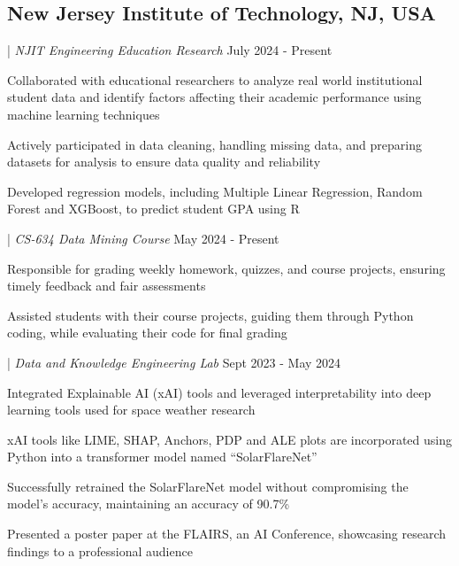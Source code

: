 \subsection{New Jersey Institute of Technology, \textnormal{ NJ, USA}}
{ | \textit{NJIT Engineering Education Research} \hfill July 2024 - Present}
\begin{zitemize}
    \item Collaborated with educational researchers to analyze real world institutional student data and identify factors affecting their academic performance using machine learning techniques
    \item Actively participated in data cleaning, handling missing data, and preparing datasets for analysis to ensure data quality and reliability
    \item Developed regression models, including Multiple Linear Regression, Random Forest and XGBoost, to predict student GPA using R
\end{zitemize}
{ | \textit{CS-634 Data Mining Course} \hfill May 2024 - Present}
\begin{zitemize}
    \item Responsible for grading weekly homework, quizzes, and course projects, ensuring timely feedback and fair assessments
    \item Assisted students with their course projects, guiding them through Python coding, while evaluating their code for final grading
\end{zitemize}
{ | \textit{Data and Knowledge Engineering Lab} \hfill Sept 2023 - May 2024}
\begin{zitemize}
    \item Integrated Explainable AI (xAI) tools and leveraged interpretability into deep learning tools used for space weather research
    \item xAI tools like LIME, SHAP, Anchors, PDP and ALE plots are incorporated using Python into a transformer model named ``SolarFlareNet''
    \item Successfully retrained the SolarFlareNet model without compromising the model's accuracy,  maintaining an accuracy of 90.7\%
    \item Presented a poster paper at the FLAIRS, an AI Conference, showcasing research findings to a professional audience
\end{zitemize}

